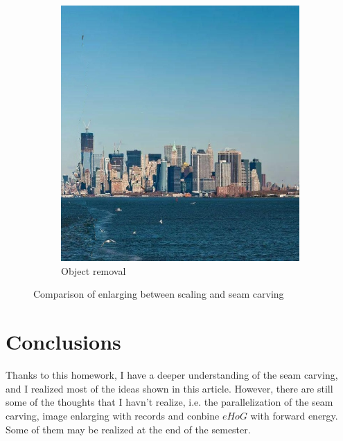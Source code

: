 \documentclass[final]{cvpr}
\begin{document}
\begin{figure}[htb]
\begin{center}
\begin{subfigure}[b]{0.70\linewidth}
    \includegraphics[width=\textwidth]{liberty_removal.jpg}
    \caption{Object removal}
\end{subfigure}
\end{center}
\caption{Comparison of enlarging between scaling and seam carving}
\label{fig:liberty_removal}
\end{figure}
\section{Conclusions}
Thanks to this homework, I have a deeper understanding of the seam carving, and I realized most of the ideas shown in this article.
However, there are still some of the thoughts that I havn't realize, i.e. the parallelization of the seam carving, image enlarging with records and conbine $eHoG$ with forward energy.
Some of them may be realized at the end of the semester.
{\small


}
\end{document}
